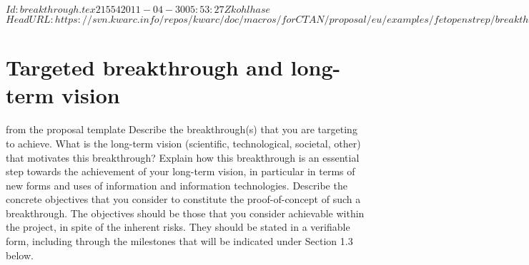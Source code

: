 \svnInfo $Id: breakthrough.tex 21554 2011-04-30 05:53:27Z kohlhase $
\svnKeyword $HeadURL: https://svn.kwarc.info/repos/kwarc/doc/macros/forCTAN/proposal/eu/examples/fetopenstrep/breakthrough.tex $
\section{Targeted breakthrough and long-term vision}\label{sec:objectives}
\begin{todo}{from the proposal template}
  Describe the breakthrough(s) that you are targeting to achieve. What is the long-term
  vision (scientific, technological, societal, other) that motivates this breakthrough?
  Explain how this breakthrough is an essential step towards the achievement of your
  long-term vision, in particular in terms of new forms and uses of information and
  information technologies. Describe the concrete objectives that you consider to
  constitute the proof-of-concept of such a breakthrough. The objectives should be those
  that you consider achievable within the project, in spite of the inherent risks. They
  should be stated in a verifiable form, including through the milestones that will be
  indicated under Section 1.3 below.
\end{todo}


